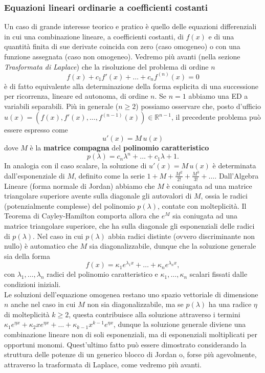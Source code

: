 \documentclass[a4paper,twoside]{article}
\newcommand{\R}{\mathbb{R}}
\theoremstyle{definition}
\numberwithin{theorem}{section}
\begin{document}
\subsubsection{Equazioni lineari ordinarie a coefficienti costanti}
Un caso di grande interesse teorico e pratico è quello delle equazioni differenziali in cui una combinazione lineare, a coefficienti costanti, di $f(x)$ e di una quantità finita di sue derivate coincida con zero (caso omogeneo) o con una funzione assegnata (caso non omogeneo). Vedremo più avanti (nella sezione \emph{Trasformata di Laplace}) che la risoluzione del problema di ordine $n$
$$ f(x) + c_1 f'(x) + \ldots + c_n f^{(n)}(x) = 0$$
è di fatto equivalente alla determinazione della forma esplicita di una successione per ricorrenza, lineare ed autonoma, di ordine $n$. Se $n=1$ abbiamo una ED a variabili separabili. Più in generale ($n\geq 2$) possiamo osservare che, posto d'ufficio $u(x)=\left(f(x),f'(x),\ldots,f^{(n-1)}(x)\right)\in\R^{n-1}$, il precedente problema può essere espresso come 
$$ u'(x) = M\,u(x) $$
dove $M$ è la \textbf{matrice compagna} del \textbf{polinomio caratteristico}
$$ p(\lambda) = c_n \lambda^n + \ldots + c_1 \lambda + 1. $$
In analogia con il caso scalare, la soluzione di $u'(x)=M\,u(x)$ è determinata dall'esponenziale di $M$, definito come la serie $1+M+\frac{M^2}{2!}+\frac{M^3}{3!}+\ldots$. Dall'Algebra Lineare (forma normale di Jordan) abbiamo che $M$ è coniugata ad una matrice triangolare superiore avente sulla diagonale gli autovalori di $M$, ossia le radici (potenzialmente complesse) del polinomio $p(\lambda)$, contate con molteplicità. Il Teorema di Cayley-Hamilton comporta allora che $e^M$ sia coniugata ad una matrice triangolare superiore, che ha sulla diagonale gli esponenziali delle radici di $p(\lambda)$. Nel caso in cui $p(\lambda)$ abbia radici distinte (ovvero discriminante non nullo) è automatico che $M$ sia diagonalizzabile, dunque che la soluzione generale sia della forma 
$$ f(x) = \kappa_1 e^{\lambda_1 x}+\ldots+\kappa_n e^{\lambda_n x}, $$
con $\lambda_1,\ldots,\lambda_n$ radici del polinomio caratteristico e $\kappa_1,\ldots,\kappa_n$ scalari fissati dalle condizioni iniziali.\\
Le soluzioni dell'equazione omogenea restano uno spazio vettoriale di dimensione $n$ anche nel caso in cui $M$ non sia diagonalizzabile, ma se $p(\lambda)$ ha una radice $\eta$ di molteplicità $k\geq 2$, questa contribuisce alla soluzione attraverso i termini $\kappa_1 e^{\eta x}+\kappa_2 x e^{\eta x}+\ldots+\kappa_{k-1} x^{k-1} e^{\eta x}$, dunque la soluzione generale diviene una combinazione lineare non di soli esponenziali, ma di esponenziali moltiplicati per opportuni monomi. Quest'ultimo fatto può essere dimostrato considerando la struttura delle potenze di un generico blocco di Jordan o, forse più agevolmente, attraverso la trasformata di Laplace, come vedremo più avanti.
\end{document}
